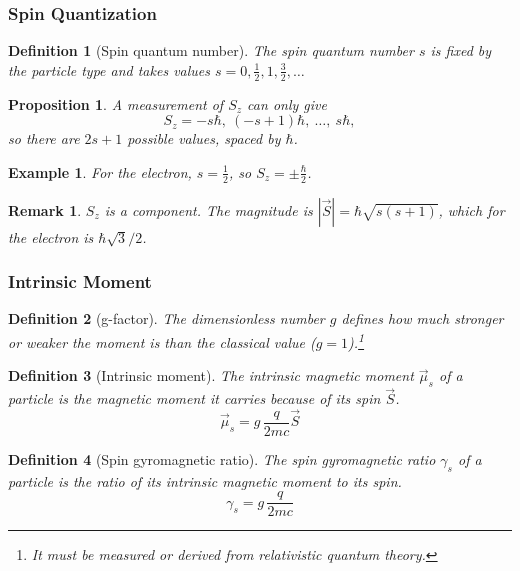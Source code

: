 \documentclass{article}
\newtheorem{definition}{Definition}
\newtheorem*{example}{Example}
\newtheorem{remark}{Remark}
\newtheorem{proposition}{Proposition}
\begin{document}
\subsubsection{Spin Quantization}
\begin{definition}[Spin quantum number]
    The spin quantum number $s$ is fixed by the particle type and takes values $s = 0, \tfrac12, 1, \tfrac32, \dots$
\end{definition}
\begin{proposition}
    A measurement of $S_z$ can only give
    \begin{equation}
        \label{eq:Sz-quantized}
        S_z = -s\hbar,\ (-s+1)\hbar,\ \dots,\ s\hbar,
    \end{equation}
    so there are $2s+1$ possible values, spaced by $\hbar$.
\end{proposition}
\begin{example}
    For the electron, $s = \tfrac12$, so $S_z = \pm\frac{\hbar}{2}$.
\end{example}
\begin{remark}
    $S_z$ is a component. The magnitude is $|\vec{S}| = \hbar\sqrt{s(s+1)}$, which for the electron is $\hbar\sqrt{3}/2$.
\end{remark}

\subsubsection{Intrinsic Moment}
\begin{definition}[g-factor]
    The dimensionless number $g$ defines how much stronger or weaker the moment is than the classical value ($g = 1$).\footnote{It must be measured or derived from relativistic quantum theory.}
\end{definition}
\begin{definition}[Intrinsic moment]
    The intrinsic magnetic moment $\vec{\mu}_s$ of a particle is the magnetic moment it carries because of its spin $\vec{S}$.
    \begin{equation}
        \label{eq:intrinsic-moment}
        \vec{\mu}_s = g\,\frac{q}{2mc}\vec{S}
    \end{equation}
\end{definition}
\begin{definition}[Spin gyromagnetic ratio]
    The spin gyromagnetic ratio $\gamma_s$ of a particle is the ratio of its intrinsic magnetic moment to its spin.
    \begin{equation}
        \label{eq:spin-gyromagnetic-ratio}
        \gamma_s = g\,\frac{q}{2mc}
    \end{equation}
\end{definition}
\end{document}
